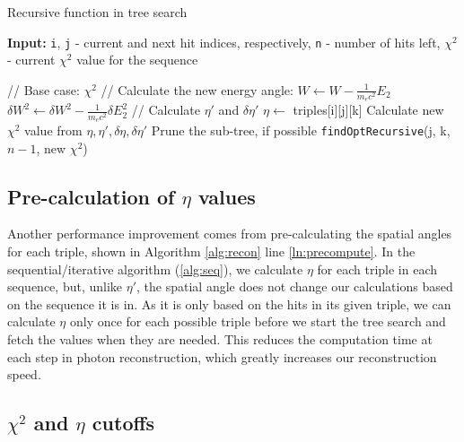 \begin{algorithm}
\caption{Recursive function in tree search}\label{alg:recurse}
\hspace{\algorithmicindent} \textbf{Input:} \texttt{i}, \texttt{j} - current and next hit indices, respectively, \texttt{n} - number of hits left, $\chi^2$ - current $\chi^2$ value for the sequence
\begin{algorithmic}[1]
    \State // Base case:
     \label{ln:hitsUsed}
        \State \Return $\chi^2$
    \EndIf
    \State
        \State // Calculate the new energy angle:
        \State $W \gets W - \frac{1}{m_e c^2}E_2$ 
        \State $\delta W^2 \gets \delta W^2 - \frac{1}{m_e c^2}\delta E_2^2$
        \State
        \State // Calculate $\eta'$ and $\delta \eta'$ 
        \State $\eta \gets$ triples[i][j][k] 
        \State
        \State Calculate new $\chi^2$ value from $\eta, \eta', \delta\eta, \delta\eta'$  \label{ln:chi2}
        \State
        \State Prune the sub-tree, if possible 
        \State
        \State \texttt{findOptRecursive}(j, k, $n-1$, new $\chi^2$) 
    \EndFor
\EndFunction
\end{algorithmic}
\end{algorithm}

\subsection{Pre-calculation of $\eta$ values}
Another performance improvement comes from pre-calculating the spatial angles for each triple, shown in Algorithm \ref{alg:recon} line \ref{ln:precompute}. In the sequential/iterative algorithm (\ref{alg:seq}), we calculate $\eta$ for each triple in each sequence, but, unlike $\eta'$, the spatial angle does not change our calculations based on the sequence it is in. As it is only based on the hits in its given triple, we can calculate $\eta$ only once for each possible triple before we start the tree search and fetch the values when they are needed. This reduces the computation time at each step in photon reconstruction, which greatly increases our reconstruction speed.

\subsection{$\chi^2$ and $\eta$ cutoffs} \label{pruning}

